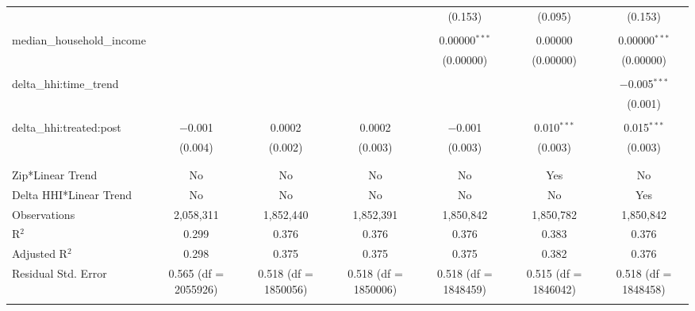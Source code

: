 \begin{table}[H]
{\begin{tabular}{@{\extracolsep{5pt}}lcccccc}
   &  &  &  & (0.153) & (0.095) & (0.153) \\  

   & & & & & & \\  

  median\_household\_income &  &  &  & 0.00000$^{***}$ & 0.00000 & 0.00000$^{***}$ \\  

   &  &  &  & (0.00000) & (0.00000) & (0.00000) \\  

   & & & & & & \\  

  delta\_hhi:time\_trend &  &  &  &  &  & $-$0.005$^{***}$ \\  

   &  &  &  &  &  & (0.001) \\  

   & & & & & & \\  

  delta\_hhi:treated:post & $-$0.001 & 0.0002 & 0.0002 & $-$0.001 & 0.010$^{***}$ & 0.015$^{***}$ \\  

   & (0.004) & (0.002) & (0.003) & (0.003) & (0.003) & (0.003) \\  

   & & & & & & \\  

 \hline \\[-1.8ex]  

 Zip*Linear Trend & No & No & No & No & Yes & No \\  

 Delta HHI*Linear Trend & No & No & No & No & No & Yes \\  

 Observations & 2,058,311 & 1,852,440 & 1,852,391 & 1,850,842 & 1,850,782 & 1,850,842 \\  

 R$^{2}$ & 0.299 & 0.376 & 0.376 & 0.376 & 0.383 & 0.376 \\  

 Adjusted R$^{2}$ & 0.298 & 0.375 & 0.375 & 0.375 & 0.382 & 0.376 \\  

 Residual Std. Error & 0.565 (df = 2055926) & 0.518 (df = 1850056) & 0.518 (df = 1850006) & 0.518 (df = 1848459) & 0.515 (df = 1846042) & 0.518 (df = 1848458) \\  

 \hline  

 \hline \\[-1.8ex]  


\end{tabular}}
\end{table}
